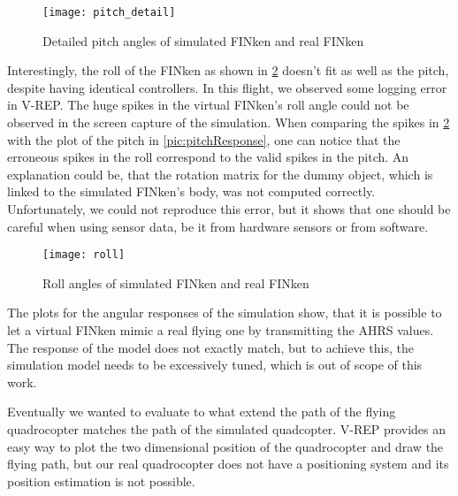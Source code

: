 \begin{figure}
	\begin{center}
	\texttt{[image: pitch\_detail]}
	\caption{Detailed pitch angles of simulated FINken and real FINken}
	\label{pic:pitchDetail}
	\end{center}
\end{figure}

Interestingly, the roll of the FINken as shown in \ref{pic:rollResponse} doesn't fit as well as the pitch, despite having identical controllers.
In this flight, we observed some logging error in V-REP. 
The huge spikes in the virtual FINken's roll angle could not be observed in the screen capture of the simulation.
When comparing the spikes in \ref{pic:rollResponse} with the plot of the pitch in \ref{pic:pitchResponse}, one can notice that the erroneous spikes in the roll correspond to the valid spikes in the pitch.
An explanation could be, that the rotation matrix for the dummy object, which is linked to the simulated FINken's body, was not computed correctly.
Unfortunately, we could not reproduce this error, but it shows that one should be careful when using sensor data, be it from hardware sensors or from software.

\begin{figure}
	\begin{center}
	\texttt{[image: roll]}
	\caption{Roll angles of simulated FINken and real FINken}
	\label{pic:rollResponse}
	\end{center}
\end{figure}

The plots for the angular responses of the simulation show, that it is possible to let a virtual FINken mimic a real flying one by transmitting the \gls{AHRS} values. 
The response of the model does not exactly match, but to achieve this, the simulation model needs to be excessively tuned, which is out of scope of this work.


Eventually we wanted to evaluate to what extend the path of the flying quadrocopter matches the path of the simulated quadcopter. V-REP provides an easy way to plot the two dimensional position of the quadrocopter and draw the flying path, but our real quadrocopter does not have a positioning system and its position estimation is not possible.\\ 

